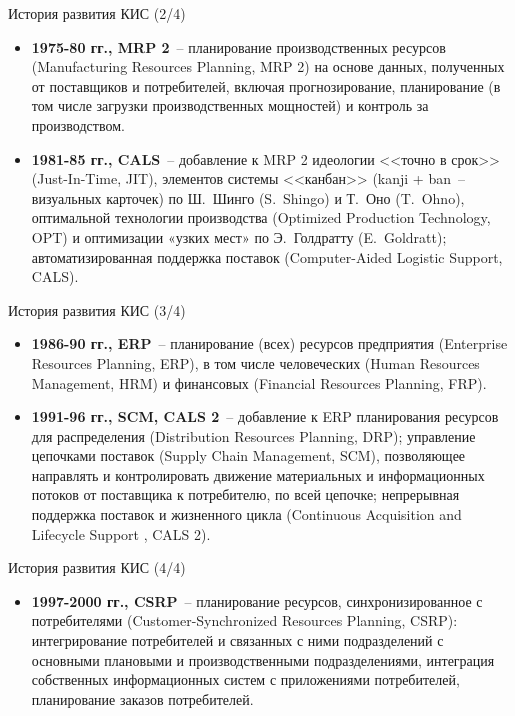 \documentclass[aspectratio=169]{beamer}
\begin{document}
\begin{frame}{История развития КИС (2/4)}
  \begin{itemize}
    \item {
    \textbf{1975-80 гг., MRP 2}~-- планирование производственных ресурсов (Manufacturing Resources Planning, MRP 2) на основе данных, полученных от поставщиков и потребителей, включая прогнозирование, планирование (в том числе загрузки производственных мощностей) и контроль за производством.
  }
  \item {
    \textbf{1981-85 гг., CALS}~-- добавление к MRP 2 идеологии <<точно в срок>> (Just-In-Time, JIT), элементов системы <<канбан>> (kanji + ban~-- визуальных карточек) по Ш.~Шинго (S.~Shingo) и Т.~Оно (T.~Ohno), оптимальной технологии производства (Optimized Production Technology, OPT) и оптимизации «узких мест» по Э.~Голдратту (E.~Goldratt); автоматизированная поддержка поставок (Computer-Aided Logistic Support, CALS).
  }
  \end{itemize}
\end{frame}

\begin{frame}{История развития КИС (3/4)}
  \begin{itemize}
    \item {
    \textbf{1986-90 гг., ERP}~-- планирование (всех) ресурсов предприятия (Enterprise Resources Planning, ERP), в том числе человеческих (Human Resources Management, HRM) и финансовых (Financial Resources Planning, FRP).
  }
  \item {
    \textbf{1991-96 гг., SCM, CALS 2}~-- добавление к ERP планирования ресурсов для распределения (Distribution Resources Planning, DRP); управление цепочками поставок (Supply Chain Management, SCM), позволяющее направлять и контролировать движение материальных и информационных потоков от поставщика к потребителю, по всей цепочке; непрерывная поддержка поставок и жизненного цикла (Continuous Acquisition and Lifecycle Support , CALS 2).
  }
  \end{itemize}
\end{frame}

\begin{frame}{История развития КИС (4/4)}
  \begin{itemize}
  \item {
    \textbf{1997-2000 гг., CSRP}~-- планирование ресурсов, синхронизированное с потребителями (Customer-Synchronized Resources Planning, CSRP): интегрирование потребителей и связанных с ними подразделений с основными плановыми и производственными подразделениями, интеграция собственных информационных систем с приложениями потребителей, планирование заказов потребителей.
  }
  \end{itemize}
\end{frame}
\end{document}
